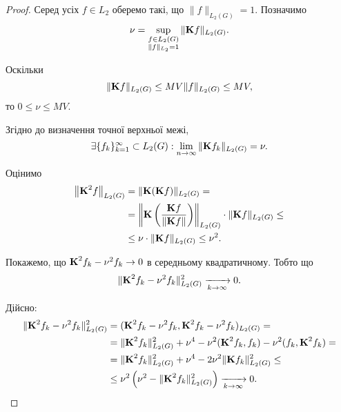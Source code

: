 \begin{proof}
	Серед усіх $f \in L_2$ оберемо такі, що $\|f\|_{L_2(G)} = 1$. Позначимо 
	\begin{equation}
		\nu = \Sup_{\substack{f \in L_2(G) \\ \|f\|_{L_2} = 1}} \|\bf{K} f\|_{L_2(G)}.
	\end{equation}
	
	Оскільки
	\begin{equation}
		\|\bf{K} f\|_{L_2(G)} \le MV \|f\|_{L_2(G)} \le MV,
	\end{equation}
	то $0 \le \nu \le MV$. \medskip

	Згідно до визначення точної верхньої межі,
	\begin{equation}
		\exists \{ f_k \}_{k = 1}^\infty \subset L_2(G):\lim_{n \to \infty} \|\bf{K} f_k\|_{L_2(G)} = \nu.
	\end{equation}

	Оцінимо 
	\begin{equation}
		\begin{aligned} 
		\left\| \bf{K}^2 f\right\|_{L_2(G)} &= \| \bf{K} (\bf{K} f)\|_{L_2(G)} = \\
		&=  \left\| \bf{K}\left( \dfrac{\bf{K}f}{\|\bf{K}f\|}\right) \right\|_{L_2(G)} \cdot \|\bf{K} f\|_{L_2(G)} \le \\
		&\le  \nu \cdot \|\bf{K} f\|_{L_2(G)} \le \nu^2.
		\end{aligned}
	\end{equation}
	
	Покажемо, що $\bf{K}^2 f_k - \nu^2 f_k \to 0$ в середньому квадратичному. Тобто що
	\begin{equation}
		\| \bf{K}^2 f_k - \nu^2 f_k \|_{L_2(G)}^2 \xrightarrow[k \to \infty]{} 0.
	\end{equation}

	Дійсно:
	\begin{equation}
		\begin{aligned}
			\| \bf{K}^2 f_k - \nu^2 f_k \|_{L_2(G)}^2 &= (\bf{K}^2 f_k - \nu^2 f_k, \bf{K}^2 f_k - \nu^2 f_k)_{L_2(G)} = \\
			&= \|\bf{K}^2 f_k\|_{L_2(G)}^2 + \nu^4 - \nu^2 (\bf{K}^2 f_k, f_k) - \nu^2 (f_k, \bf{K}^2 f_k) = \\
			&= \|\bf{K}^2 f_k\|_{L_2(G)}^2 + \nu^4 - 2 \nu^2 \|\bf{K} f_k\|_{L_2(G)}^2 \le \\
			&\le \nu^2 \left(\nu^2 - \|\bf{K}^2 f_k\|_{L_2(G)}^2\right) \xrightarrow[k\to\infty]{} 0.
		\end{aligned}
	\end{equation}


\end{proof}
